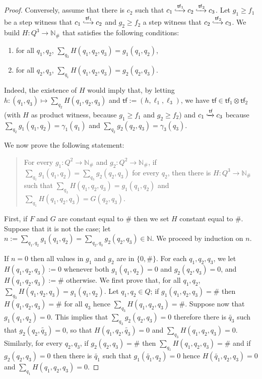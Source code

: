 \documentclass[10pt,a4paper]{article}
\let\mathbb\mathds
\renewcommand{\geq}{\geqslant}
\newcommand{\nats}{\mathbb{N}}
\newcommand{\set}[1]{\{#1\}}
\newcommand{\deff}{:=}
\newcommand{\config}{\gamma}
\newcommand*{\states}{Q}
\newcommand*{\abuchistate}{\ell}
\newcommand*{\controlloc}{\abuchistate}
\newcommand{\prodconfig}{c}
\newcommand*{\dummysymb}{\#}
\newcommand*{\natsanddummy}{\nats_{\dummysymb}}
\newcommand*{\atf}{\mathsf{tf}}
\newcommand*{\tftimes}{\otimes}
\newcommand*{\flowstep}[1]{\xhookrightarrow{#1}}
\begin{document}
\begin{appendixproof}
\begin{proof}
		Conversely, assume that there is \(\prodconfig_2\) such that \(\prodconfig_1 \flowstep{\atf_1} \prodconfig_2 \flowstep{\atf_2} \prodconfig_3\).
		Let \(g_1\geq f_1\) be a step witness that \(\prodconfig_1 \flowstep{\atf_1} \prodconfig_2\) and \(g_2 \geq f_2\) a step witness that \(\prodconfig_2 \flowstep{\atf_2} \prodconfig_3\).
		We build \(H : \states^3 \to \natsanddummy\) that satisfies the following conditions:
		\begin{enumerate}[label=(\roman*),ref=(\roman*),topsep=3pt]
			\item \label{comp-cond1} for all \(q_1,q_2\), \(\sum_{q_3}
			      H(q_1,q_2,q_3) = g_1(q_1,q_2)\), \item \label{comp-cond2} for all \(q_2,q_3\), \(\sum_{q_1} H(q_1,q_2,q_3) = g_2(q_2,q_3)\).
		\end{enumerate}
		Indeed, the existence of \(H\) would imply that, by letting \(h : (q_1,q_3) \mapsto \sum_{q_2} H(q_1,q_2,q_3)\) and \(\atf \deff (h,\controlloc_1,\controlloc_3)\), we have \(\atf \in \atf_1 \tftimes \atf_2\) (with \(H\) as product witness, because \(g_1 \geq f_1\) and \(g_2 \geq f_2\)) and \(\prodconfig_1 \flowstep{\atf} \prodconfig_3\) because \(\sum_{q_2} g_1(q_1,q_2) = \config_1(q_1)\) and \(\sum_{q_2} g_2(q_2,q_3) = \config_3(q_3)\).

		We now prove the following statement:
		\begin{quote}
			For every \(g_1: \states^2 \to \natsanddummy\) and \(g_2: \states^2 \to \natsanddummy\), if \(\sum_{q_1} g_1(q_1,q_2) = \sum_{q_3} g_2(q_2,q_3)\) for every \(q_2\), then there is \(H: \states^3 \to \natsanddummy\) such that \(\sum_{q_3} H(q_1,q_2,q_3) = g_1(q_1,q_2)\) and \(\sum_{q_1} H(q_1,q_2,q_3) = G(q_2,q_3)\).
		\end{quote}
		First, if \(F\) and \(G\) are constant equal to \(\dummysymb\) then we set \(H\) constant equal to \(\dummysymb\).
		Suppose that it is not the case; let \(n \deff \sum_{q_1,q_2} g_1(q_1,q_2) = \sum_{q_2,q_3} g_2(q_2,q_3) \in \nats\).
		We proceed by induction on \(n\).

		If \(n=0\) then all values in \(g_1\) and \(g_2\) are in \(\set{0,\dummysymb}\).
		For each \(q_1,q_2,q_3\), we let \(H(q_1,q_2,q_3) \deff 0\) whenever both \(g_1(q_1,q_2) =0\) and \(g_2(q_2,q_3) =0\), and \(H(q_1,q_2,q_3) \deff \dummysymb\) otherwise.
		We first prove that, for all \(q_1,q_2\), \(\sum_{q_3} H(q_1,q_2,q_3) = g_1(q_1,q_2)\).
		Let \(q_1,q_2 \in \states\); if \(g_1(q_1,q_2,q_3) = \dummysymb\) then \(H(q_1,q_2,q_3) = \dummysymb\) for all \(q_3\) hence \(\sum_{q_3} H(q_1,q_2,q_3) = \dummysymb\).
		Suppose now that \(g_1(q_1,q_2) = 0\).
		This implies that \(\sum_{q_3} g_2(q_2,q_3) = 0\) therefore there is \(\tilde{q_3}\) such that \(g_2(q_2,\tilde{q_3}) =0\), so that \(H(q_1,q_2,\tilde{q_3})=0\) and \(\sum_{q_3} H(q_1,q_2,q_3) = 0\).
		Similarly, for every \(q_2,q_3\), if \(g_2(q_2,q_3) = \dummysymb\) then \(\sum_{q_1} H(q_1,q_2,q_3) = \dummysymb\) and if \(g_2(q_2,q_3) = 0\) then there is \(\tilde{q_1}\) such that \(g_1(\tilde{q_1},q_2) =0\) hence \(H(\tilde{q_1},q_2,q_3) =0\) and \(\sum_{q_1} H(q_1,q_2,q_3) =0\).


\end{proof}
\end{appendixproof}
\end{document}
